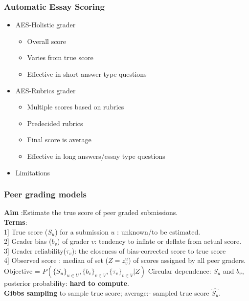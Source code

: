 \documentclass[13pt]{beamer}
\begin{document}
\begin{frame}
	\frametitle{Automatic Essay Scoring}
	\begin{itemize}
	  \item AES-Holistic grader
		\begin{itemize}
		 \item Overall score
		 \item Varies from true score
		 \item Effective in short answer type questions
		\end{itemize}

	  \item AES-Rubrics grader 
		\begin{itemize}
		    \item Multiple scores based on rubrics
		    \item Predecided rubrics
		    \item Final score is average
		    \item Effective in long answers/essay type questions
		    \end{itemize}
	   \item Limitations
	\end{itemize}

\end{frame}



\begin{frame}
	\frametitle{Peer grading models}
	\textbf{Aim} :Estimate the true score of peer graded submissions. \\
	\textbf{Terms}:\\  1] True score ($S_u$) for a submission $u$ : unknown/to be estimated.\\
	2] Grader bias ($b_v$) of grader $v$: tendency to inflate or deflate from actual score. \\ 
	3] Grader reliability($\tau_v$): the closeness of bias-corrected score to true score \\ 
	4] Observed score : median of set ($Z = {z}^{u}_{v}$) of scores assigned by all peer graders.\\
	Objective = $P(\{S_u\}_{u\in U}, \{b_v\}_{v \in V}, \{\tau_v\}_{v \in V }| Z)$ \newline
	Circular dependence: $S_u$  and $b_v$, posterior probability: \textbf{hard to compute}. \\
	\textbf{Gibbs sampling} to sample true score; average:- sampled true score $\hat{S_u}$. 
\end{frame}
\end{document}

